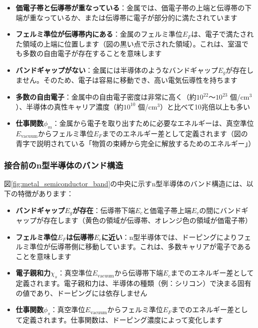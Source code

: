 \begin{itemize}
\item \textbf{価電子帯と伝導帯が重なっている}：金属では、価電子帯の上端と伝導帯の下端が重なっているか、または伝導帯に電子が部分的に満たされています

\item \textbf{フェルミ準位が伝導帯内にある}：金属のフェルミ準位$E_F$は、電子で満たされた領域の上端に位置します（図の黒い点で示された領域）。これは、室温でも多数の自由電子が存在することを意味します

\item \textbf{バンドギャップがない}：金属には半導体のようなバンドギャップ$E_g$が存在しません。そのため、電子は容易に移動でき、高い電気伝導性を持ちます

\item \textbf{多数の自由電子}：金属中の自由電子密度は非常に高く（約$10^{22}$〜$10^{23}$ 個/cm$^3$）、半導体の真性キャリア濃度（約$10^{10}$ 個/cm$^3$）と比べて10兆倍以上も多い

\item \textbf{仕事関数$\phi_m$}：金属から電子を取り出すために必要なエネルギーは、真空準位$E_{\text{vacuum}}$からフェルミ準位$E_F$までのエネルギー差として定義されます（図の青字で説明されている「物質の束縛から完全に解放するためのエネルギー」）
\end{itemize}

\subsubsection{接合前のn型半導体のバンド構造}

図\ref{fig:metal_semiconductor_band}の中央に示すn型半導体のバンド構造には、以下の特徴があります：

\begin{itemize}
\item \textbf{バンドギャップ$E_g$が存在}：伝導帯下端$E_c$と価電子帯上端$E_v$の間にバンドギャップが存在します（黄色の領域が伝導帯、オレンジ色の領域が価電子帯）

\item \textbf{フェルミ準位$E_F$は伝導帯$E_c$に近い}：n型半導体では、ドーピングによりフェルミ準位が伝導帯側に移動しています。これは、多数キャリアが電子であることを意味します

\item \textbf{電子親和力$\chi_s$}：真空準位$E_{\text{vacuum}}$から伝導帯下端$E_c$までのエネルギー差として定義されます。電子親和力は、半導体の種類（例：シリコン）で決まる固有の値であり、ドーピングには依存しません

\item \textbf{仕事関数$\phi_s$}：真空準位$E_{\text{vacuum}}$からフェルミ準位$E_F$までのエネルギー差として定義されます。仕事関数は、ドーピング濃度によって変化します
\end{itemize}

